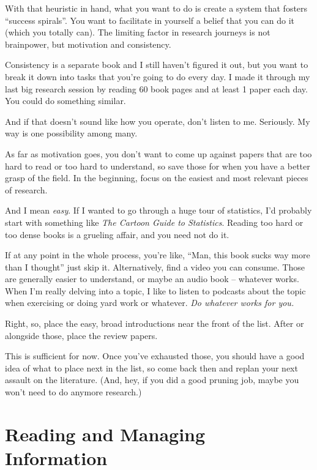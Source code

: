 With that heuristic in hand, what you want to do is create a system that fosters ``success spirals''. You want to facilitate in yourself a belief that you can do it (which
you totally can). The limiting factor in research journeys is not brainpower, but motivation and consistency.

Consistency is a separate book and I still
haven't figured it out, but you want to break it down into tasks that you're
going to do every day. I made it through my last big research session by
reading 60 book pages and at least 1 paper each day. You could do something
similar.

And if that doesn't sound like how you operate, don't listen to
  me. Seriously. My way is one possibility among many.

As far as motivation goes, you don't want to come up against
papers that are too hard to read or too hard to understand, so save those for
when you have a better grasp of the field. In the beginning, focus on the
easiest and most relevant pieces of research.

And I mean \textit{easy}. If I wanted to go through a huge tour of statistics,
I'd probably start with something like \textit{The Cartoon Guide to
  Statistics}. Reading too hard or too dense books is a grueling affair, and you
need not do it.

If at any point in the whole process, you're like, ``Man, this book sucks way
more than I thought'' just skip it. Alternatively, find a video you can
consume. Those are generally easier to understand, or maybe an audio book -- whatever works. When I'm really delving into a topic, I
like to listen to podcasts about the topic when exercising or doing yard work or
whatever. \textit{Do whatever works for you.}


Right, so, place the easy, broad introductions near the front of the list. After
or alongside those, place the review papers.

This is sufficient for now. Once you've exhausted those, you should
have a good idea of what to place next in the list, so come back then and replan
your next assault on the literature. (And, hey, if you did a good pruning job,
maybe you won't need to do anymore research.)

\section{Reading and Managing Information}

